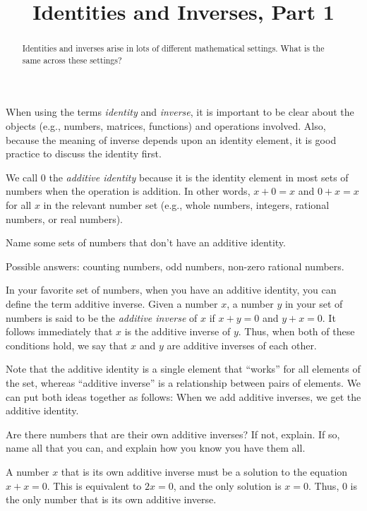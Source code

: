 \documentclass{ximera}
\title{Identities and Inverses, Part 1}
\begin{document}
\begin{abstract}
Identities and inverses arise in lots of different mathematical
settings.  What is the same across these settings?  
\end{abstract}
\maketitle



\begin{description}
\item When using the terms \emph{identity} and \emph{inverse}, it is
important to be clear about the objects (e.g., numbers, matrices,
functions) and operations involved.  Also, because the meaning of
inverse depends upon an identity element, it is good practice to
discuss the identity first.
\end{description}

We call $0$ the \emph{additive identity} because it is the identity
element in most sets of numbers when the operation is addition.  In
other words, $x+0=x$ and $0+x=x$ for all $x$ in the relevant number
set (e.g., whole numbers, integers, rational numbers, or real
numbers).
\begin{question}
Name some sets of numbers that don't have an additive identity.
\begin{freeResponse}
Possible answers: counting numbers, odd numbers, non-zero rational
numbers.
\end{freeResponse}
\end{question}

In your favorite set of numbers, when you have an additive identity,
you can define the term additive inverse.  Given a number $x$, a
number $y$ in your set of numbers is said to be the \emph{additive
  inverse} of $x$ if $x+y=0$ and $y+x=0$.  It follows immediately that
$x$ is the additive inverse of $y$.  Thus, when both of these
conditions hold, we say that $x$ and $y$ are additive inverses of each
other.

Note that the additive identity is a single element that ``works'' for
all elements of the set, whereas ``additive inverse'' is a
relationship between pairs of elements.  We can put both ideas
together as follows: When we add additive inverses, we get the
additive identity.

\begin{question}
Are there numbers that are their own additive inverses?  If not,
explain.  If so, name all that you can, and explain how you know you
have them all.
\begin{freeResponse}
A number $x$ that is its own additive inverse must be a solution to
the equation $x+x = 0$.  This is equivalent to $2x=0$, and the only
solution is $x=0$.  Thus, 0 is the only number that is its own
additive inverse.
\end{freeResponse}
\end{question}
\end{document}
